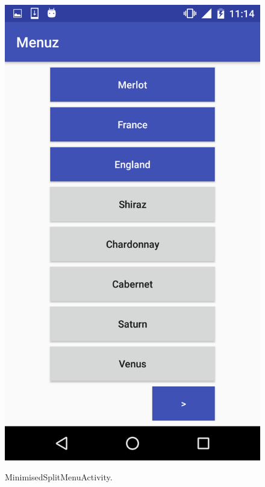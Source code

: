 \begin{figure}[!ht]
  \begin{center}
    \includegraphics[scale=0.22]{img/minisplit_menu.png}
    \label{fig:minisplit_menu}
    \caption{MinimisedSplitMenuActivity.}
  \end{center}
\end{figure}

\newpage

